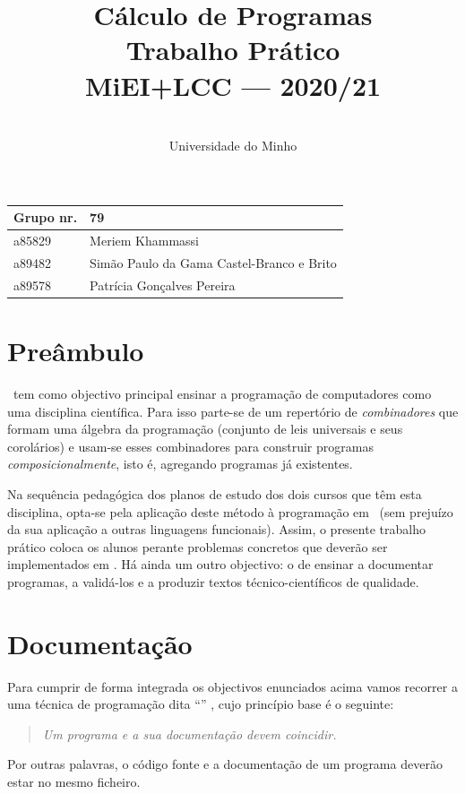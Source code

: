 \documentclass[a4paper]{article}
\title{
       	Cálculo de Programas
\\
       	Trabalho Prático
\\
       	MiEI+LCC --- 2020/21
}
\author{
       	\dium
\\
       	Universidade do Minho
}
\date\mydate
\begin{document}
\maketitle

\begin{center}\large
\begin{tabular}{ll}
\textbf{Grupo} nr. & 79
\\\hline
a85829 & Meriem Khammassi 	
\\
a89482 & Simão Paulo da Gama Castel-Branco e Brito
\\
a89578 & Patrícia Gonçalves Pereira
\end{tabular}
\end{center}

\section{Preâmbulo}

\CP\ tem como objectivo principal ensinar
a progra\-mação de computadores como uma disciplina científica. Para isso
parte-se de um repertório de \emph{combinadores} que formam uma álgebra da
programação (conjunto de leis universais e seus corolários) e usam-se esses
combinadores para construir programas \emph{composicionalmente}, isto é,
agregando programas já existentes.
  
Na sequência pedagógica dos planos de estudo dos dois cursos que têm
esta disciplina, opta-se pela aplicação deste método à programação
em \Haskell\ (sem prejuízo da sua aplicação a outras linguagens 
funcionais). Assim, o presente trabalho prático coloca os
alunos perante problemas concretos que deverão ser implementados em
\Haskell.  Há ainda um outro objectivo: o de ensinar a documentar
programas, a validá-los e a produzir textos técnico-científicos de
qualidade.

\section{Documentação} Para cumprir de forma integrada os objectivos
enunciados acima vamos recorrer a uma técnica de programa\-ção dita
``'' \cite{Kn92}, cujo princípio base é o seguinte:
%
\begin{quote}\em Um programa e a sua documentação devem coincidir.
\end{quote}
%
Por outras palavras, o código fonte e a documentação de um
programa deverão estar no mesmo ficheiro.
\end{document}
